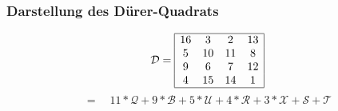 \documentclass[11pt]{beamer}
\begin{document}
\begin{frame}
\frametitle{Darstellung des Dürer-Quadrats}
\begin{align*}
\mathcal{D} =
\begin{array}{|cccc|}
\hline
16 & 3 & 2 & 13 \\ 
5 & 10 &  11& 8  \\ 
9 &  6 & 7 &  12\\ 
4 &  15 & 14 &  1\\
\hline
\end{array}  
\end{align*}
\[
 = \quad  11 * \mathcal{Q} + 9*\mathcal{B} + 5*\mathcal{U} + 4*\mathcal{R} + 3*\mathcal{X} + \mathcal{S} + \mathcal{T}
\]


\end{frame}
\end{document}
